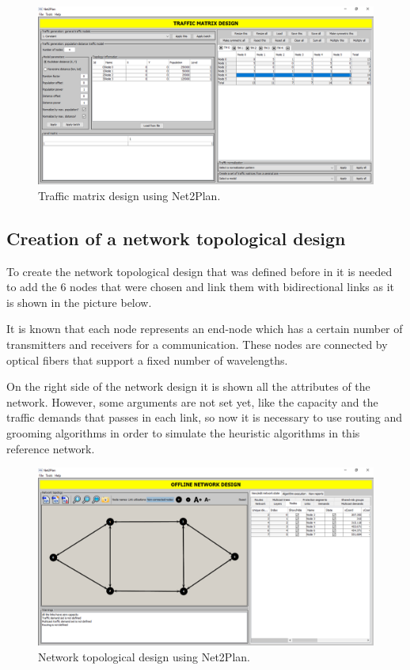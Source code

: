 \begin{figure}[h!]
\centering
\includegraphics[width=12cm]{sdf/heuristic/figures/traffic_matrix_design}
\caption{Traffic matrix design using Net2Plan.}
\label{traffic_matrix_design}
\end{figure}

\subsection{Creation of a network topological design}\label{creation_topological_design}

\vspace{11pt}
To create the network topological design that was defined before in \label{creation_traffic_matrices} it is needed to add the 6 nodes that were chosen and link them with bidirectional links as it is shown in the picture \label{network_topological_design} below.

It is known that each node represents an end-node which has a certain number of transmitters and receivers for a communication. These nodes are connected by optical fibers that support a fixed number of wavelengths.

On the right side of the network design it is shown all the attributes of the network. However, some arguments are not set yet, like the capacity and the traffic demands that passes in each link, so now it is necessary to use routing and grooming algorithms in order to simulate the heuristic algorithms in this reference network.

\begin{figure}[h!]
\centering
\includegraphics[width=12cm]{sdf/heuristic/figures/network_topological_design}
\caption{Network topological design using Net2Plan.}
\label{network_topological_design}
\end{figure}

